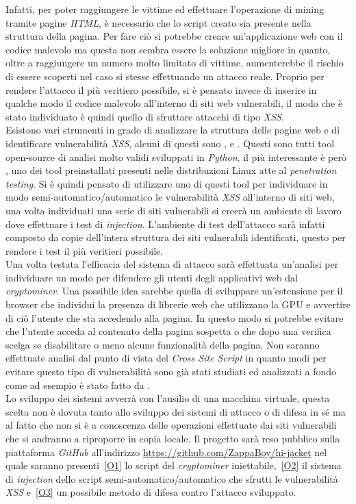 \documentclass[
11pt, %
oneside, %
italian, %
onehalfspacing,%
headsepline, %
]{MastersDoctoralThesis} %
\newcommand\citen[1]{\citeauthor{#1} \citep{#1}}
\newcommand\citetitlen[1]{\citetitle{#1} \citep{#1}}
\begin{document}
Infatti, per poter raggiungere le vittime ed effettuare l'operazione di mining tramite pagine \emph{HTML}, è necessario che lo script creato sia presente nella struttura della pagina. Per fare ciò si potrebbe creare un'applicazione web con il codice malevolo ma questa non sembra essere la soluzione migliore in quanto, oltre a raggiungere un numero molto limitato di vittime, aumenterebbe il rischio di essere scoperti nel caso si stesse effettuando un attacco reale. Proprio per rendere l'attacco il più veritiero possibile, si è pensato invece di inserire in qualche modo il codice malevolo all'interno di siti web vulnerabili, il modo che è stato individuato è quindi quello di sfruttare attacchi di tipo \emph{XSS}.\\
Esistono vari strumenti in grado di analizzare la struttura delle pagine web e di identificare vulnerabilità \emph{XSS}, alcuni di questi sono \citetitlen{XSStrike}, \citetitlen{Traxss} e \citetitlen{XSSer}. Questi sono tutti tool open-source di analisi molto validi sviluppati in \emph{Python}, il più interessante è però , uno dei tool preinstallati presenti nelle distribuzioni Linux atte al \emph{penetration testing}. Si è quindi pensato di utilizzare uno di questi tool per individuare in modo semi-automatico/automatico le vulnerabilità \emph{XSS} all'interno di siti web, una volta individuati una serie di siti vulnerabili si creerà un ambiente di lavoro dove effettuare i test di \emph{injection}. L'ambiente di test dell'attacco sarà infatti composto da copie dell'intera struttura dei siti vulnerabili identificati, questo per rendere i test il più veritieri possibile.\\
Una volta testata l'efficacia del sistema di attacco sarà effettuata un'analisi per individuare un modo per difendere gli utenti degli applicativi web dal \emph{cryptominer}. Una possibile idea sarebbe quella di sviluppare un'estensione per il browser che individui la presenza di librerie web che utilizzano la GPU e avvertire di ciò l'utente che sta accedendo alla pagina. In questo modo si potrebbe evitare che l'utente acceda al contenuto della pagina sospetta o che dopo una verifica scelga se disabilitare o meno alcune funzionalità della pagina. Non saranno effettuate analisi dal punto di vista del \emph{Cross Site Script} in quanto modi per evitare questo tipo di vulnerabilità sono già stati studiati ed analizzati a fondo come ad esempio è stato fatto da \citen{bisht2008xss}.\\
Lo sviluppo dei sistemi avverrà con l'ausilio di una macchina virtuale, questa scelta non è dovuta tanto allo sviluppo dei sistemi di attacco o di difesa in sé ma al fatto che non si è a conoscenza delle operazioni effettuate dai siti vulnerabili che si andranno a riproporre in copia locale. Il progetto sarà reso pubblico sulla piattaforma \emph{GitHub} all'indirizzo \url{https://github.com/ZappaBoy/hi-jacket} nel quale saranno presenti~\ref{O1} lo script del \emph{cryptominer} iniettabile,~\ref{O2} il sistema di \emph{injection} dello script semi-automatico/automatico che sfrutti le vulnerabilità \emph{XSS} e~\ref{O3} un possibile metodo di difesa contro l'attacco sviluppato.


\printbibliography\
\end{document}
